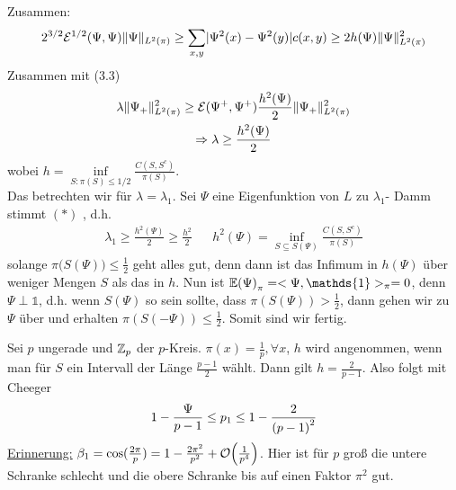 \begin{beweis}
	Zusammen: 
	\begin{align}
		2^{3/2} \mathcal{E}^{1/2}(\Psi,\Psi) \lVert\Psi\rVert_{L^2(\pi)} \geq \sum\limits_{x,y} \lvert\Psi^2(x) - \Psi^2(y)\rvert c(x,y) \geq 2 h(\Psi) \lVert\Psi\rVert^2_{L^2(\pi)}
	\end{align}
	Zusammen mit (3.3) 
	\begin{gather}
		\lambda \lVert\Psi_+\rVert^2_{L^2(\pi)} \geq \mathcal{E}(\Psi^+,\Psi^+) \frac{h^2(\Psi)}{2} \lVert\Psi_+\rVert^2_{L^2(\pi)} \\
		\Rightarrow \lambda \geq \frac{h^2(\Psi)}{2}
	\end{gather}	
	wobei $h = \inf\limits_{S: \pi(S) \leq 1/2} \frac{C(S,S^c)}{\pi(S)}$. \\
	Das betrechten wir für $\lambda = \lambda_1$. Sei $\Psi$ eine Eigenfunktion von $L$ zu $\lambda_1$- Damm stimmt $(*)$ , d.h. 
	\begin{align}
		\lambda_1 \geq \frac{h^2(\Psi)}{2} \geq \frac{h^2}{2} && h^2(\Psi) = \inf\limits_{S \subseteq S(\Psi)} \frac{C(S,S^c)}{\pi(S)}
	\end{align}
	solange $\pi\Big(S(\Psi)\Big) \leq \frac{1}{2}$ geht alles gut, denn dann ist das Infimum in $h(\Psi)$ über weniger Mengen $S$ als das in $h$. Nun ist $\EW{\Psi}_{\pi} = <\Psi, \mathds{1}>_{\pi} = 0$, denn $\Psi \perp \mathds{1}$, d.h. wenn $S(\Psi)$ so sein sollte, dass $\pi(S(\Psi)) > \frac{1}{2}$, dann gehen wir zu $\Psi$ über und erhalten $\pi(S(-\Psi)) \leq \frac{1}{2}$. Somit sind wir fertig.
\end{beweis}
\begin{beispiel}%
	Sei $p$ ungerade und $\mathbb{Z}_p$ der $p$-Kreis. $\pi(x) = \frac{1}{p}, \forall x$, $h$ wird angenommen, wenn man für $S$ ein Intervall der Länge $\frac{p-1}{2}$ wählt. Dann gilt $h = \frac{2}{p-1}$. Also folgt mit Cheeger 
	\begin{align}
	1 - \frac{\Psi}{p-1} \leq p_1 \leq 1 - \frac{2}{\left(p-1\right)^2}
	\end{align}
	\underline{Erinnerung:} $\beta_1 = \cos(\frac{2\pi}{p}) = 1 - \frac{2\pi^2}{p^2} + \mathcal{O}\enb{\frac{1}{p^4}}$. Hier ist für $p$ groß die untere Schranke schlecht und die obere Schranke bis auf einen Faktor $\pi^2$ gut.
\end{beispiel}

